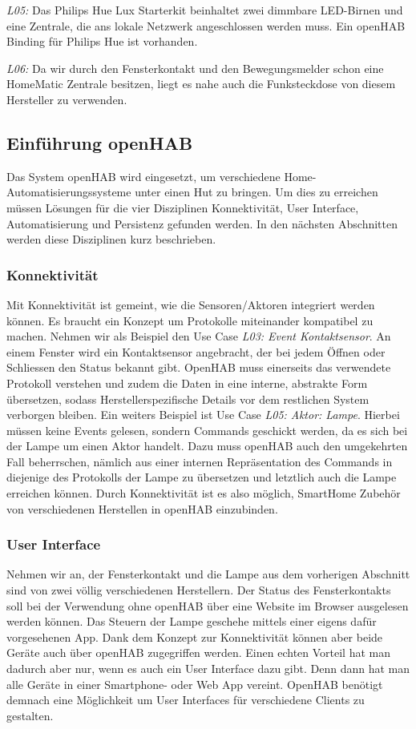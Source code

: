 \textit{L05:} Das Philips Hue Lux Starterkit beinhaltet zwei dimmbare LED-Birnen und eine Zentrale, die ans lokale Netzwerk angeschlossen werden muss. Ein openHAB Binding für Philips Hue ist vorhanden.

\textit{L06:} Da wir durch den Fensterkontakt und den Bewegungsmelder schon eine HomeMatic Zentrale besitzen, liegt es nahe auch die Funksteckdose von diesem Hersteller zu verwenden.

\subsection{Einführung openHAB}
Das System openHAB wird eingesetzt, um verschiedene Home-Automatisierungssysteme unter einen Hut zu bringen. Um dies zu erreichen müssen Lösungen für die vier Disziplinen Konnektivität, User Interface, Automatisierung und Persistenz gefunden werden. In den nächsten Abschnitten werden diese Disziplinen kurz beschrieben.

\subsubsection{Konnektivität}
Mit Konnektivität ist gemeint, wie die Sensoren/Aktoren integriert werden können. Es braucht ein Konzept um Protokolle miteinander kompatibel zu machen. Nehmen wir als Beispiel den Use Case \emph{L03: Event Kontaktsensor}. An einem Fenster wird ein Kontaktsensor angebracht, der bei jedem Öffnen oder Schliessen den Status bekannt gibt. OpenHAB muss einerseits das verwendete Protokoll verstehen und zudem die Daten in eine interne, abstrakte Form übersetzen, sodass Herstellerspezifische Details vor dem restlichen System verborgen bleiben. Ein weiters Beispiel ist Use Case \emph{L05: Aktor: Lampe}. Hierbei müssen keine Events gelesen, sondern Commands geschickt werden, da es sich bei der Lampe um einen Aktor handelt. Dazu muss openHAB auch den umgekehrten Fall beherrschen, nämlich aus einer internen Repräsentation des Commands in diejenige des Protokolls der Lampe zu übersetzen und letztlich auch die Lampe erreichen können. Durch Konnektivität ist es also möglich, SmartHome Zubehör von verschiedenen Herstellen in openHAB einzubinden. 

\subsubsection{User Interface}
Nehmen wir an, der Fensterkontakt und die Lampe aus dem vorherigen Abschnitt sind von zwei völlig verschiedenen Herstellern. Der Status des Fensterkontakts soll bei der Verwendung ohne openHAB über eine Website im Browser ausgelesen werden können. Das Steuern der Lampe geschehe mittels einer eigens dafür vorgesehenen App. Dank dem Konzept zur Konnektivität können aber beide Geräte auch über openHAB zugegriffen werden. Einen echten Vorteil hat man dadurch aber nur, wenn es auch ein User Interface dazu gibt. Denn dann hat man alle Geräte in einer Smartphone- oder Web App vereint. OpenHAB benötigt demnach eine Möglichkeit um User Interfaces für verschiedene Clients zu gestalten.


